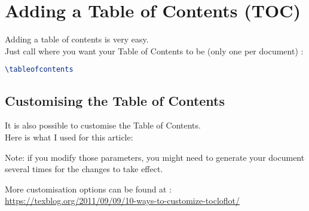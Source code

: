 \section{Adding a Table of Contents (TOC)} \label{add-toc}

Adding a table of contents is very easy. \\

Just call  where you want your Table of Contents to be (only one per document) :
\begin{lstlisting}[language=tex]
\tableofcontents
\end{lstlisting}



\subsection{Customising the Table of Contents} \label{customising-toc}

It is also possible to customise the Table of Contents. \\

Here is what I used for this article:


\bigskip

\begin{note} 
Note: if you modify those parameters, you might need to generate your document several times for the changes to take effect.
\end{note}

\bigskip

More customisation options can be found at \citep{customize-toc} : \\

\hfill
\url{https://texblog.org/2011/09/09/10-ways-to-customize-tocloflot/}


\bigskip	





